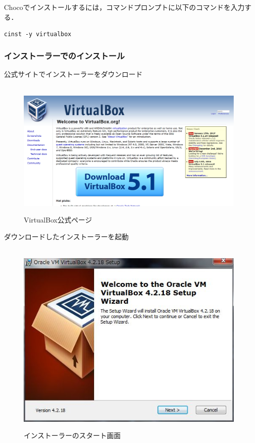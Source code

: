 Chocoでインストールするには，コマンドプロンプトに以下のコマンドを入力する．

\texttt{cinst -y virtualbox}

\subsubsection{インストーラーでのインストール}

公式サイトでインストーラーをダウンロード

\begin{figure}[htbp]
\centering　
\includegraphics[width=13cm]{VB1.png}
\caption{VirtualBox公式ページ}
\end{figure}

ダウンロードしたインストーラーを起動

\begin{figure}[htbp]
\centering　
\includegraphics[width=13cm]{VB2.png}
\caption{インストーラーのスタート画面}
\end{figure}

